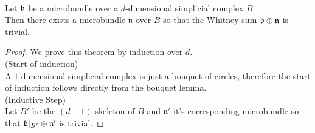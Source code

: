 \\ Let $\mathfrak{b}$ be a microbundle over a $d$-dimensional simplicial complex $B$.
\\ Then there exists a microbundle $\mathfrak{n}$ over $B$ so that the Whitney sum $\mathfrak{b} \oplus \mathfrak{n}$ is trivial.
\begin{proof}
We prove this theorem by induction over $d$.
\\ (Start of induction) \\
A $1$-dimensional simplicial complex is just a bouquet of circles, therefore
the start of induction follows directly from the bouquet lemma.   
\\ (Inductive Step) \\
Let $B'$ be the $(d - 1)$-skeleton of $B$ and $\mathfrak{n}'$ it's corresponding microbundle
so that $\mathfrak{b} \vert_{B'} \oplus \mathfrak{n}'$ is trivial.
\end{proof}